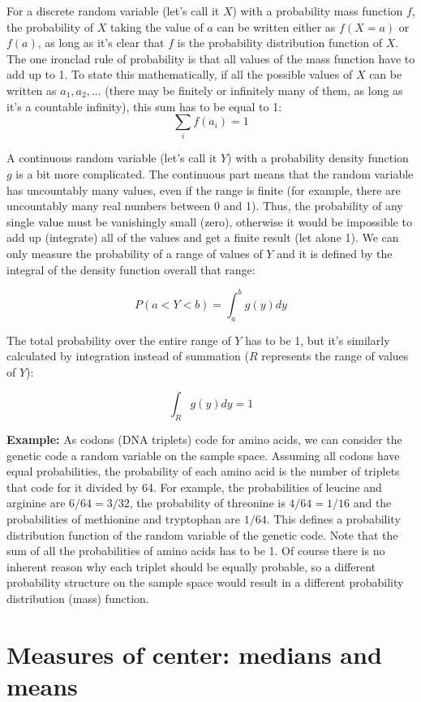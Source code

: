 \documentclass[
  letterpaper,
  DIV=11,
  numbers=noendperiod]{scrreprt}
\begin{document}
For a discrete random variable (let's call it \(X\)) with a probability
mass function \(f\), the probability of \(X\) taking the value of \(a\)
can be written either as \(f(X=a)\) or \(f(a)\), as long as it's clear
that \(f\) is the probability distribution function of \(X\). The one
ironclad rule of probability is that all values of the mass function
have to add up to 1. To state this mathematically, if all the possible
values of \(X\) can be written as \(a_1, a_2, ...\) (there may be
finitely or infinitely many of them, as long as it's a countable
infinity), this sum has to be equal to 1: \[ \sum_i f(a_i) = 1 \]

A continuous random variable (let's call it \(Y\)) with a probability
density function \(g\) is a bit more complicated. The continuous part
means that the random variable has uncountably many values, even if the
range is finite (for example, there are uncountably many real numbers
between 0 and 1). Thus, the probability of any single value must be
vanishingly small (zero), otherwise it would be impossible to add up
(integrate) all of the values and get a finite result (let alone 1). We
can only measure the probability of a range of values of \(Y\) and it is
defined by the integral of the density function overall that range:

\[ P( a< Y < b) = \int_a ^b g(y) dy \]

The total probability over the entire range of \(Y\) has to be 1, but
it's similarly calculated by integration instead of summation (\(R\)
represents the range of values of \(Y\)):

\[ \int_R g(y) dy = 1\]

\textbf{Example:} As codons (DNA triplets) code for amino acids, we can
consider the genetic code a random variable on the sample space.
Assuming all codons have equal probabilities, the probability of each
amino acid is the number of triplets that code for it divided by 64. For
example, the probabilities of leucine and arginine are \(6/64 = 3/32\),
the probability of threonine is \(4/64 = 1/16\) and the probabilities of
methionine and tryptophan are \(1/64\). This defines a probability
distribution function of the random variable of the genetic code. Note
that the sum of all the probabilities of amino acids has to be 1. Of
course there is no inherent reason why each triplet should be equally
probable, so a different probability structure on the sample space would
result in a different probability distribution (mass) function.

\hypertarget{measures-of-center-medians-and-means}{%
\section{Measures of center: medians and
means}\label{measures-of-center-medians-and-means}}
\end{document}
